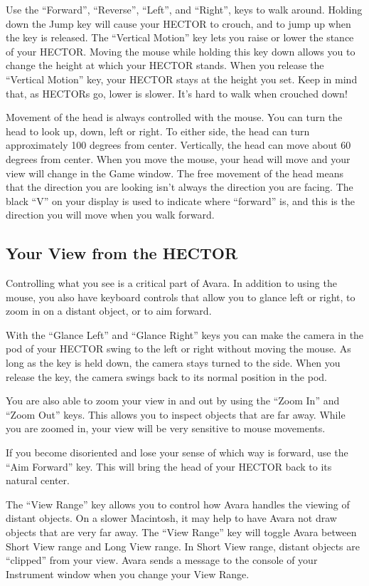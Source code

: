 \documentclass{article}
\begin{document}
Use the ``Forward'', ``Reverse'', ``Left'', and ``Right'', keys to walk around. Holding down the Jump key will cause your HECTOR to crouch, and to jump up when the key is released. The ``Vertical Motion'' key lets you raise or lower the stance of your HECTOR. Moving the mouse while holding this key down allows you to change the height at which your HECTOR stands. When you release the ``Vertical Motion'' key, your HECTOR stays at the height you set. Keep in mind that, as HECTORs go, lower is slower. It's hard to walk when crouched down!

Movement of the head is always controlled with the mouse. You can turn the head to look up, down, left or right. To either side, the head can turn approximately 100 degrees from center. Vertically, the head can move about 60 degrees from center. When you move the mouse, your head will move and your view will change in the Game window. The free movement of the head means that the direction you are looking isn't always the direction you are facing. The black ``V'' on your display is used to indicate where ``forward'' is, and this is the direction you will move when you walk forward.

\subsection{Your View from the HECTOR}
Controlling what you see is a critical part of Avara. In addition to using the mouse, you also have keyboard controls that allow you to glance left or right, to zoom in on a distant object, or to aim forward.

With the ``Glance Left'' and ``Glance Right'' keys you can make the camera in the pod of your HECTOR swing to the left or right without moving the mouse. As long as the key is held down, the camera stays turned to the side. When you release the key, the camera swings back to its normal position in the pod.

You are also able to zoom your view in and out by using the ``Zoom In'' and ``Zoom Out'' keys. This allows you to inspect objects that are far away. While you are zoomed in, your view will be very sensitive to mouse movements.

If you become disoriented and lose your sense of which way is forward, use the ``Aim Forward'' key. This will bring the head of your HECTOR back to its natural center.

The ``View Range'' key allows you to control how Avara handles the viewing of distant objects. On a slower Macintosh, it may help to have Avara not draw objects that are very far away. The ``View Range'' key will toggle Avara between Short View range and Long View range. In Short View range, distant objects are ``clipped'' from your view. Avara sends a message to the console of your Instrument window when you change your View Range.
\end{document}
